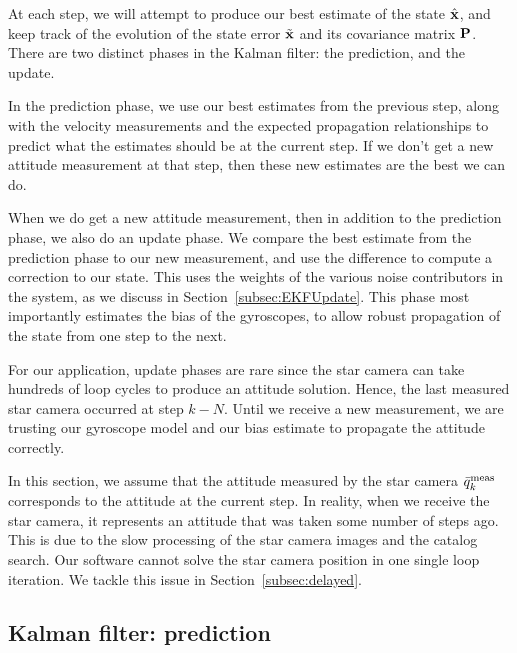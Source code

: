 At each step, we will attempt to produce our best estimate of the state $\hat{\textrm{\textbf{x}}}$, and keep track of the evolution of the state error $\tilde{\textrm{\textbf{x}}}$ and its covariance matrix $\textrm{\textbf{P}}$. There are two distinct phases in the Kalman filter: the prediction, and the update.

In the prediction phase, we use our best estimates from the previous step, along with the velocity measurements and the expected propagation relationships to predict what the estimates should be at the current step. If we don't get a new attitude measurement at that step, then these new estimates are the best we can do.

When we do get a new attitude measurement, then in addition to the prediction phase, we also do an update phase. We compare the best estimate from the prediction phase to our new measurement, and use the difference to compute a correction to our state. This uses the weights of the various noise contributors in the system, as we discuss in Section~\ref{subsec:EKFUpdate}. This phase most importantly estimates the bias of the gyroscopes, to allow robust propagation of the state from one step to the next.

For our application, update phases are rare since the star camera can take hundreds of loop cycles to produce an attitude solution. Hence, the last measured star camera occurred at step $k-N$. Until we receive a new measurement, we are trusting our gyroscope model and our bias estimate to propagate the attitude correctly.

In this section, we assume that the attitude measured by the star camera $\bar{q}^{\textrm{meas}}_k$ corresponds to the attitude at the current step. In reality, when we receive the star camera, it represents an attitude that was taken some number of steps ago. This is due to the slow processing of the star camera images and the catalog search. Our software cannot solve the star camera position in one single loop iteration. We tackle this issue in Section~\ref{subsec:delayed}. 

\subsection{Kalman filter: prediction}


